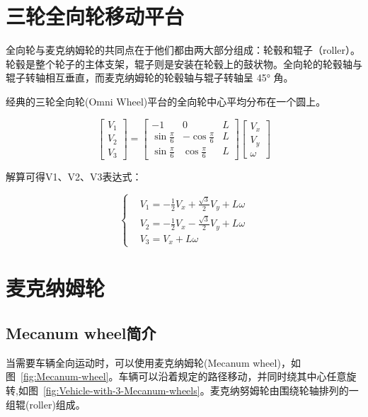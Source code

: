 \section{三轮全向轮移动平台}
全向轮与麦克纳姆轮的共同点在于他们都由两大部分组成：轮毂和辊子（roller）。轮毂是整个轮子的主体支架，辊子则是安装在轮毂上的鼓状物。全向轮的轮毂轴与辊子转轴相互垂直，而麦克纳姆轮的轮毂轴与辊子转轴呈 45° 角。

经典的三轮全向轮(Omni Wheel)平台的全向轮中心平均分布在一个圆上。

\begin{equation}
    \left[\begin{array}{l}
    {V_{1}} \\
    {V_{2}} \\
    {V_{3}}
    \end{array}\right]=\left[\begin{array}{ccc}
    {-1} & {0} & {L} \\
    {\sin \frac{\pi}{6}} & {-\cos \frac{\pi}{6}} & {L} \\
    {\sin \frac{\pi}{6}} & {\cos \frac{\pi}{6}} & {L}
    \end{array}\right]\left[\begin{array}{l}
    {V_{x}} \\
    {V_{y}} \\
    {\omega}
    \end{array}\right]
\end{equation}

解算可得V1、V2、V3表达式：

\begin{equation}
    \left\{\begin{aligned}
    &V_{1}=-\frac{1}{2} V_{x}+\frac{\sqrt{3}}{2} V_{y}+L \omega \\
    &V_{2}=-\frac{1}{2} V_{x}-\frac{\sqrt{3}}{2} V_{y}+L \omega \\
    &V_{3}=V_{x}+L \omega
    \end{aligned}\right.
\end{equation}

\section{麦克纳姆轮}

\subsection{Mecanum wheel简介}
当需要车辆全向运动时，可以使用麦克纳姆轮(Mecanum wheel)，如图~\ref{fig:Mecanum-wheel}。车辆可以沿着规定的路径移动，并同时绕其中心任意旋转,如图~\ref{fig:Vehicle-with-3-Mecanum-wheels}。麦克纳努姆轮由围绕轮轴排列的一组辊(roller)组成。


